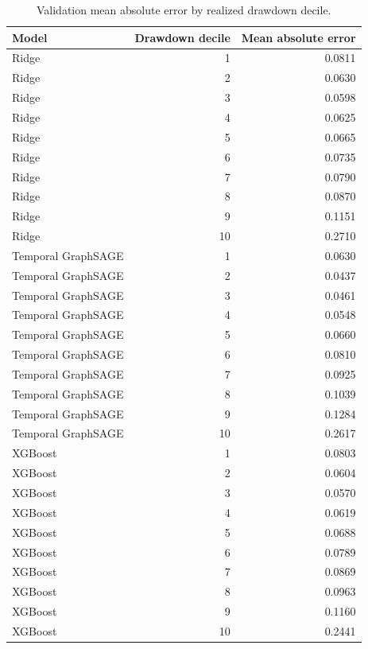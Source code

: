 \begin{table}
\caption{Validation mean absolute error by realized drawdown decile.}
\label{tab:selected-models-error-by-drawdown-decile}
\begin{tabular}{lrr}
\toprule
Model & Drawdown decile & Mean absolute error \\
\midrule
Ridge & 1 & 0.0811 \\
Ridge & 2 & 0.0630 \\
Ridge & 3 & 0.0598 \\
Ridge & 4 & 0.0625 \\
Ridge & 5 & 0.0665 \\
Ridge & 6 & 0.0735 \\
Ridge & 7 & 0.0790 \\
Ridge & 8 & 0.0870 \\
Ridge & 9 & 0.1151 \\
Ridge & 10 & 0.2710 \\
Temporal GraphSAGE & 1 & 0.0630 \\
Temporal GraphSAGE & 2 & 0.0437 \\
Temporal GraphSAGE & 3 & 0.0461 \\
Temporal GraphSAGE & 4 & 0.0548 \\
Temporal GraphSAGE & 5 & 0.0660 \\
Temporal GraphSAGE & 6 & 0.0810 \\
Temporal GraphSAGE & 7 & 0.0925 \\
Temporal GraphSAGE & 8 & 0.1039 \\
Temporal GraphSAGE & 9 & 0.1284 \\
Temporal GraphSAGE & 10 & 0.2617 \\
XGBoost & 1 & 0.0803 \\
XGBoost & 2 & 0.0604 \\
XGBoost & 3 & 0.0570 \\
XGBoost & 4 & 0.0619 \\
XGBoost & 5 & 0.0688 \\
XGBoost & 6 & 0.0789 \\
XGBoost & 7 & 0.0869 \\
XGBoost & 8 & 0.0963 \\
XGBoost & 9 & 0.1160 \\
XGBoost & 10 & 0.2441 \\
\bottomrule
\end{tabular}
\end{table}
